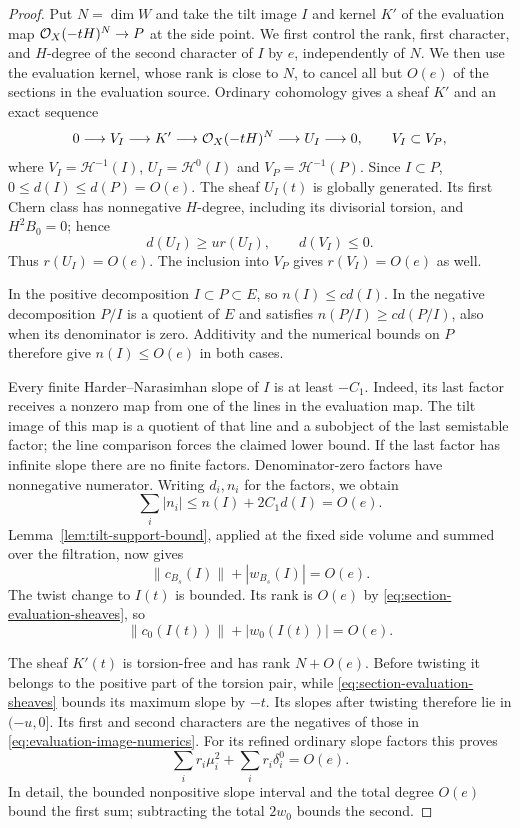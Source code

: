 \begin{proof}
Put $N=\dim W$ and take the tilt image $I$ and kernel $K'$ of the
evaluation map $\mathcal O_X(-tH)^N\to P$ at the side point.
We first control the rank, first character, and $H$-degree of the
second character of $I$ by $e$, independently of $N$.  We then use
the evaluation kernel, whose rank is close to $N$, to cancel all
but $O(e)$ of the sections in the evaluation source.
Ordinary cohomology gives a sheaf $K'$ and an exact sequence
\begin{equation}\label{eq:section-evaluation-sheaves}
 0\longrightarrow V_I\longrightarrow K'
 \longrightarrow\mathcal O_X(-tH)^N\longrightarrow U_I\longrightarrow0,
 \qquad V_I\subset V_P,
\end{equation}
where $V_I=\mathcal H^{-1}(I)$, $U_I=\mathcal H^0(I)$ and
$V_P=\mathcal H^{-1}(P)$.  Since $I\subset P$,
$0\leq d(I)\leq d(P)=O(e)$.  The sheaf $U_I(t)$ is globally
generated.  Its first Chern class has nonnegative $H$-degree,
including its divisorial torsion, and $H^2B_0=0$; hence
\[
 d(U_I)\geq u r(U_I),\qquad d(V_I)\leq0.
\]
Thus $r(U_I)=O(e)$.  The inclusion into $V_P$ gives
$r(V_I)=O(e)$ as well.

In the positive decomposition $I\subset P\subset E$, so
$n(I)\leq c d(I)$.  In the negative decomposition $P/I$ is a
quotient of $E$ and satisfies $n(P/I)\geq c d(P/I)$, also when its
denominator is zero.  Additivity and the numerical bounds on $P$
therefore give $n(I)\leq O(e)$ in both cases.

Every finite Harder--Narasimhan slope of $I$ is at least $-C_1$.
Indeed, its last factor receives a nonzero map from one of the
lines in the evaluation map.  The tilt image of this map is a
quotient of that line and a subobject of the last semistable
factor; the line comparison forces the claimed lower bound.
If the last factor has infinite slope there are no finite factors.
Denominator-zero factors have nonnegative numerator.  Writing
$d_i,n_i$ for the factors, we obtain
\[
 \sum_i|n_i|\leq n(I)+2C_1d(I)=O(e).
\]
Lemma~\ref{lem:tilt-support-bound}, applied at the fixed side
volume and summed over the filtration, now gives
\[
 \|c_{B_s}(I)\|+|w_{B_s}(I)|=O(e).
\]
The twist change to $I(t)$ is bounded.  Its rank is $O(e)$ by
\eqref{eq:section-evaluation-sheaves}, so
\begin{equation}\label{eq:evaluation-image-numerics}
 \|c_0(I(t))\|+|w_0(I(t))|=O(e).
\end{equation}

The sheaf $K'(t)$ is torsion-free and has rank $N+O(e)$.
Before twisting it belongs to the positive part of the torsion
pair, while \eqref{eq:section-evaluation-sheaves} bounds its maximum
slope by $-t$.  Its slopes after twisting therefore lie in
$(-u,0]$.  Its first and second characters are the negatives of
those in \eqref{eq:evaluation-image-numerics}.  For its refined
ordinary slope factors this proves
\begin{equation}\label{eq:evaluation-kernel-moments}
 \sum_i r_i\mu_i^2+\sum_i r_i\delta_i^0=O(e).
\end{equation}
In detail, the bounded nonpositive slope interval and the total
degree $O(e)$ bound the first sum; subtracting the total $2w_0$
bounds the second.


\end{proof}
